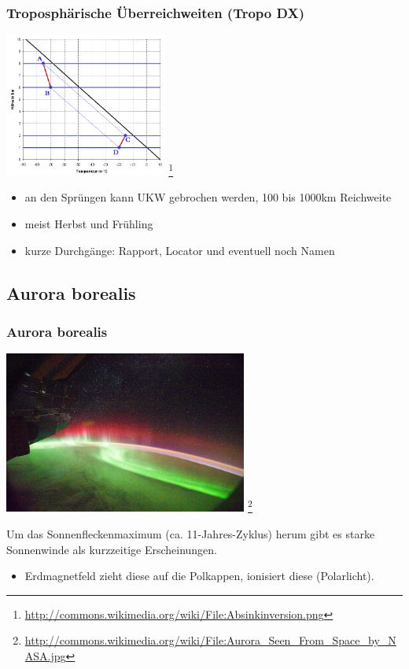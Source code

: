\begin{frame}
    \frametitle{Troposphärische Überreichweiten (Tropo DX)}

    \begin{center}
        \includegraphics[width=0.4\textwidth]{bv11/Absinkinversion.png}
        \footnote{\tiny \url{http://commons.wikimedia.org/wiki/File:Absinkinversion.png}}
    \end{center}

    \begin{itemize}
        \item an den Sprüngen kann UKW gebrochen werden, 100 bis 1000km Reichweite
        \item meist Herbst und Frühling
        \item kurze Durchgänge: Rapport, Locator und eventuell noch Namen
    \end{itemize}

\end{frame}

\subsection{Aurora borealis}

\begin{frame}
    \frametitle{Aurora borealis}

    \begin{center}
        \includegraphics[width=0.6\textwidth]{bv11/Aurora_Seen_From_Space_by_NASA.jpg}
        \footnote{\tiny \url{http://commons.wikimedia.org/wiki/File:Aurora_Seen_From_Space_by_NASA.jpg}}
    \end{center}

    Um das Sonnenfleckenmaximum (ca. 11-Jahres-Zyklus) herum gibt es starke
    Sonnenwinde als kurzzeitige Erscheinungen.

    \begin{itemize}
        \item Erdmagnetfeld zieht diese auf die Polkappen, ionisiert diese (Polarlicht).
    \end{itemize}

\end{frame}

